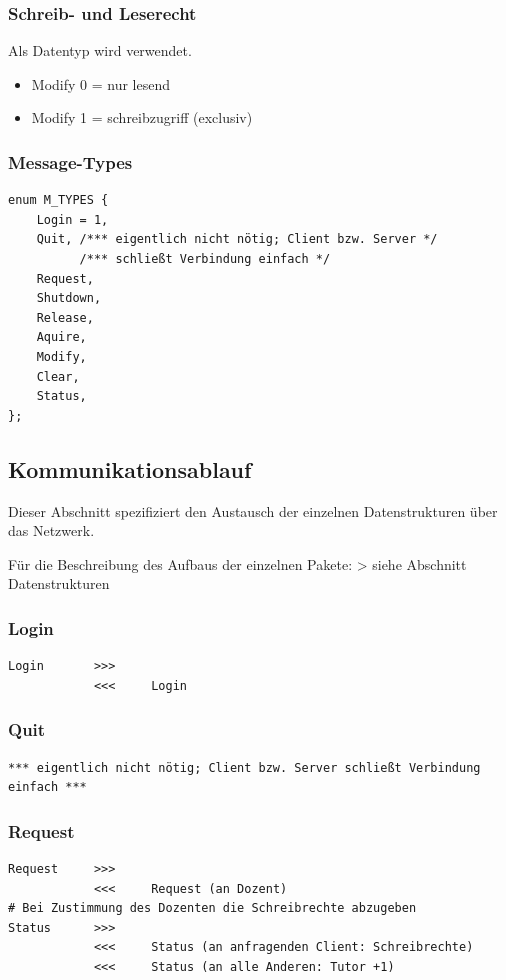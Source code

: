 \subsubsection{Schreib- und Leserecht}
Als Datentyp wird  verwendet.
\begin{itemize}
	\item Modify 0 = nur lesend
	\item Modify 1 = schreibzugriff (exclusiv)
\end{itemize}

\subsubsection{Message-Types}
\begin{lstlisting}
enum M_TYPES {
    Login = 1,
    Quit, /*** eigentlich nicht nötig; Client bzw. Server */
          /*** schließt Verbindung einfach */
    Request,
    Shutdown,
    Release,
    Aquire,
    Modify,
    Clear,
    Status,
};
\end{lstlisting}

\subsection{Kommunikationsablauf}
Dieser Abschnitt spezifiziert den Austausch der einzelnen Datenstrukturen
über das Netzwerk.

Für die Beschreibung des Aufbaus der einzelnen Pakete: 
> siehe Abschnitt Datenstrukturen

\subsubsection{Login}
\begin{lstlisting}
Login       >>>
            <<<     Login
\end{lstlisting}

\subsubsection{Quit}
\begin{lstlisting}
*** eigentlich nicht nötig; Client bzw. Server schließt Verbindung einfach ***
\end{lstlisting}

\subsubsection{Request}
\begin{lstlisting}
Request     >>>
            <<<     Request (an Dozent)
# Bei Zustimmung des Dozenten die Schreibrechte abzugeben
Status      >>>
            <<<     Status (an anfragenden Client: Schreibrechte)
            <<<     Status (an alle Anderen: Tutor +1)
\end{lstlisting}

